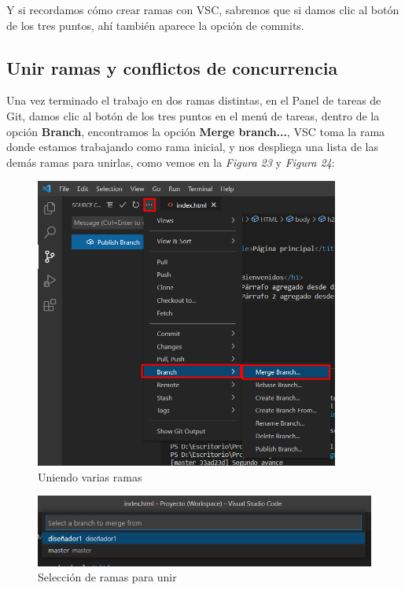 Y si recordamos cómo crear ramas con VSC, sabremos que si damos clic al botón de los tres puntos, ahí también aparece la opción de commits.

\subsection{Unir ramas y conflictos de concurrencia}
\hspace{0.55cm}Una vez terminado el trabajo en dos ramas distintas, en el Panel de tareas de Git, damos clic al botón de los tres puntos en el menú de tareas, dentro de la opción \textbf{Branch}, encontramos la opción \textbf{Merge branch...}, VSC toma la rama donde estamos trabajando como rama inicial, y nos despliega una lista de las demás ramas para unirlas, como vemos en la \textit{Figura 23} y \textit{Figura 24}:
\begin{figure}[H]
    \begin{center}
        \caption{Uniendo varias ramas}
        \label{fig: 23}
        \includegraphics[width=10cm]{capturas/merge1.png}
    \end{center}
\end{figure}
\begin{figure}[H]
    \begin{center}
        \caption{Selección de ramas para unir}
        \label{fig: 24}
        \includegraphics[width=14cm]{capturas/merge2.png}
    \end{center}
\end{figure}

